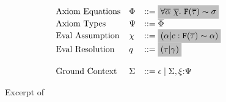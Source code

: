 \documentclass[format=acmsmall,manuscript,screen,nonacm,margin=1in,11pt]{acmart}
\begin{document}
\begin{figure}[ht]
\[\begin{array}{l l l l l}
      &\text{Axiom Equations} &\AxiomEq     &\bnfeq \text{\shaded{$\Forall{\many\alpha~\many\chi}{\FamCtrs(\many\tau)
                                              \teq \sigma$}}}\\
      &\text{Axiom Types}     &\AxiomTy     &\bnfeq \many\AxiomEq\\
      &\text{Eval Assumption}   &\chi &\bnfeq \text{\shaded{$(\alpha|c : \FamCtrs(\many\tau) \teq \alpha)$}} \\
      &\text{Eval Resolution}   &q    &\bnfeq \text{\shaded{$(\tau|\Co)$}}\\      
      \\
      &\text{Ground Context} &\GEnv   &\bnfeq \empt \bnfor \GEnv,\Axiom\co\AxiomTy
    \end{array}
  \]
  \caption[\QLTF]{Excerpt of \QLTF}
  \label{fig:tf-constrained-system}
\end{figure}
\end{document}
